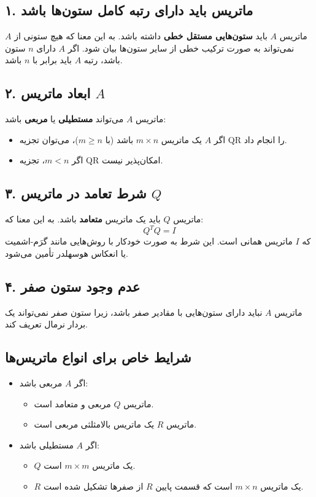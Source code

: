 \subsection*{۱. ماتریس باید دارای رتبه کامل ستون‌ها باشد}
ماتریس \( A \) باید \textbf{ستون‌هایی مستقل خطی} داشته باشد. به این معنا که هیچ ستونی از \( A \) نمی‌تواند به صورت ترکیب خطی از سایر ستون‌ها بیان شود. اگر \( A \) دارای \( n \) ستون باشد، رتبه \( A \) باید برابر با \( n \) باشد.

\subsection*{۲. ابعاد ماتریس \( A \)}
ماتریس \( A \) می‌تواند \textbf{مستطیلی} یا \textbf{مربعی} باشد:
\begin{itemize}
	\item اگر \( A \) یک ماتریس \( m \times n \) باشد (با \( m \geq n \))، می‌توان تجزیه QR را انجام داد.
	\item اگر \( m < n \)، تجزیه QR امکان‌پذیر نیست.
\end{itemize}

\subsection*{۳. شرط  تعامد در ماتریس \( Q \)}
ماتریس \( Q \) باید یک ماتریس \textbf{ متعامد} باشد. به این معنا که:
\[
Q^T Q = I
\]
که \( I \) ماتریس همانی است. این شرط به صورت خودکار با روش‌هایی مانند گرَم-اشمیت یا انعکاس هوسهلدر تأمین می‌شود.

\subsection*{۴. عدم وجود ستون صفر}
ماتریس \( A \) نباید دارای ستون‌هایی با مقادیر صفر باشد، زیرا ستون صفر نمی‌تواند یک بردار نرمال تعریف کند.

\subsection*{شرایط خاص برای انواع ماتریس‌ها}
\begin{itemize}
	\item اگر \( A \) مربعی باشد:
	\begin{itemize}
		\item ماتریس \( Q \) مربعی و متعامد است.
		\item ماتریس \( R \) یک ماتریس بالا‌مثلثی مربعی است.
	\end{itemize}
	\item اگر \( A \) مستطیلی باشد:
	\begin{itemize}
		\item \( Q \) یک ماتریس \( m \times m \) است.
		\item \( R \) یک ماتریس \( m \times n \) است که قسمت پایین \( R \) از صفرها تشکیل شده است.
	\end{itemize}
\end{itemize}


